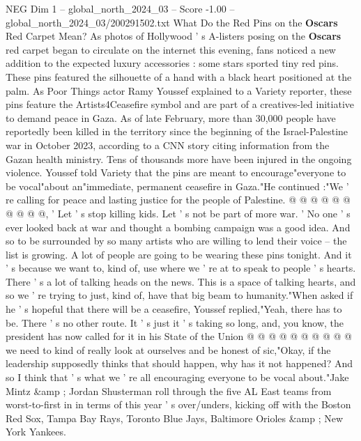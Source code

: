 \begin{textsample}{NEG Dim 1 – global\_north\_2024\_03 – Score -1.00 – global\_north\_2024\_03/200291502.txt}  \label{ex:f1_neg_074}
What Do the Red Pins on the \textbf{Oscars} Red Carpet Mean?
As photos of Hollywood ' s A-listers posing on the \textbf{Oscars} red carpet began to circulate on the internet this evening, fans noticed a new addition to the expected luxury accessories : some stars sported tiny red pins.
These pins featured the silhouette of a hand with a black heart positioned at the palm.
As Poor Things actor Ramy Youssef explained to a Variety reporter, these pins feature the Artists4Ceasefire symbol and are part of a creatives-led initiative to demand peace in Gaza.
As of late February, more than 30,000 people have reportedly been killed in the territory since the beginning of the Israel-Palestine war in October 2023, according to a CNN story citing information from the Gazan health ministry.
Tens of thousands more have been injured in the ongoing violence.
Youssef told Variety that the pins are meant to encourage"everyone to be vocal"about an"immediate, permanent ceasefire in Gaza."He continued :"We ' re calling for peace and lasting justice for the people of Palestine. @ @ @ @ @ @ @ @ @ @, ' Let ' s stop killing kids.
Let ' s not be part of more war. ' No one ' s ever looked back at war and thought a bombing campaign was a good idea.
And so to be surrounded by so many artists who are willing to lend their voice -- the list is growing.
A lot of people are going to be wearing these pins tonight.
And it ' s because we want to, kind of, use where we ' re at to speak to people ' s hearts.
There ' s a lot of talking heads on the news.
This is a space of talking hearts, and so we ' re trying to just, kind of, have that big beam to humanity."When asked if he ' s hopeful that there will be a ceasefire, Youssef replied,"Yeah, there has to be.
There ' s no other route.
It ' s just it ' s taking so long, and, you know, the president has now called for it in his State of the Union @ @ @ @ @ @ @ @ @ @ we need to kind of really look at ourselves and be honest of sic,"Okay, if the leadership supposedly thinks that should happen, why has it not happened?
And so I think that ' s what we ' re all encouraging everyone to be vocal about."Jake Mintz \&amp ; Jordan Shusterman roll through the five AL East teams from worst-to-first in in terms of this year ' s over/unders, kicking off with the Boston Red Sox, Tampa Bay Rays, Toronto Blue Jays, Baltimore Orioles \&amp ; New York Yankees.

\end{textsample}
